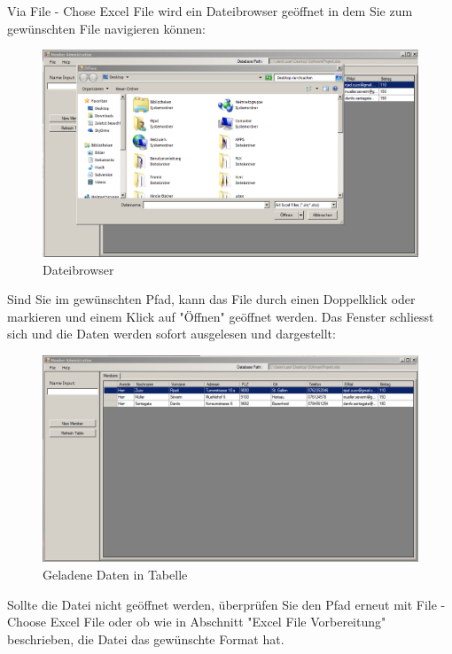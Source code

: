 \documentclass{article}
\begin{document}
Via File - Chose Excel File wird ein Dateibrowser geöffnet in dem Sie zum gewünschten File navigieren können:
\begin{figure}[h]
	\begin{center}
		\includegraphics[width=0.8\paperwidth]{Filechooser}
		\caption{Dateibrowser}
	\end{center}
\end{figure}
\newpage
Sind Sie im gewünschten Pfad, kann das File durch einen Doppelklick oder markieren und einem Klick auf "Öffnen" geöffnet werden. Das Fenster schliesst sich und die Daten werden sofort ausgelesen und dargestellt:

\begin{figure}[h]
	\begin{center}
		\includegraphics[width=0.8\paperwidth]{printscreen}
		\caption{Geladene Daten in Tabelle}
	\end{center}
\end{figure}

Sollte die Datei nicht geöffnet werden, überprüfen Sie den Pfad erneut mit File - Choose Excel File oder ob wie in Abschnitt "Excel File Vorbereitung" beschrieben, die Datei das gewünschte Format hat.
\end{document}
